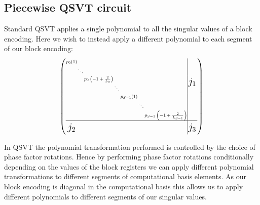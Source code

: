 \subsection{Piecewise QSVT circuit}
\label{section:circuit}
Standard QSVT applies a single polynomial to all the singular values of a block encoding. Here we wish to instead apply a different polynomial to each segment of our block encoding:
\begin{equation}
\footnotesize
\setlength{\arraycolsep}{0.5pt}
\renewcommand{\arraystretch}{1}
\left(
\begin{array}{ccccccc|cc}
\scalebox{0.8}{$p_0(1)$} &       &       &       &       &       &       & \multirow{7}{*}{\Large $j_1$} & \\
       & \scalebox{0.8}{$\ddots$} &       &       &       &       &       & & \\
       &       & \scalebox{0.8}{$p_0\left(-1 + \frac{2}{L_0}\right)$} & & & & & & \\
       &       &       & \scalebox{0.8}{$\ddots$} & & & & & \\
       &       &       &       & \scalebox{0.8}{$p_{S-1}(1)$} & & & & \\
       &       &       &       &       & \scalebox{0.8}{$\ddots$} & & & \\
       &       &       &       &       &       & \scalebox{0.8}{$p_{S-1}\left(-1 + \frac{2}{L_{S-1}}\right)$} & & \\
\hline
\multirow{2}{*}{\Large $j_2$} &       &       &       &       &       &       & \multirow{2}{*}{\Large $j_3$} & \\
                              &       &       &       &       &       &       & & \\
\end{array}
\right)
\normalsize
\label{eq:qsvt_blockencoding}
\end{equation}


In QSVT the polynomial transformation performed is controlled by the choice of phase factor rotations. Hence by performing phase factor rotations conditionally depending on the values of the block registers we can apply different polynomial transformations to different segments of computational basis elements. As our block encoding is diagonal in the computational basis this allows us to apply different polynomials to different segments of our singular values. 


